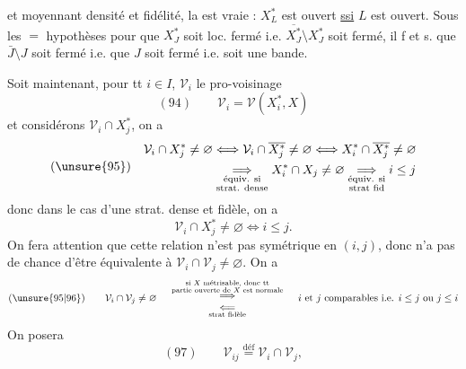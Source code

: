 
et moyennant densité et fidélité, la   est vraie : $X_L^*$ est ouvert \uline{ssi} $L$ est ouvert. Sous les $=$ hypothèses pour que $X_J^*$ soit loc. fermé i.e. $\overline{X_J^*}\setminus X_J^*$  soit fermé,  il f et s. que $\bar J\setminus J$ soit fermé i.e. que $J$ soit  fermé i.e. soit une bande.

Soit maintenant, pour tt $i\in I$, $\mathcal V_i$ le pro-voisinage
\[(94)\qquad\mathcal V_i=\mathcal V(X_i^*,X)\]
et considérons $\mathcal V_i\cap X_j^*$, on a
\[
(\unsure{95})\quad\begin{aligned}
\mathcal V_i\cap X_j^*\neq\varnothing&\Longleftrightarrow\mathcal V_i\cap\overline{X_j^*}\neq\varnothing\Longleftrightarrow X_i^*\cap\overline{X_j^*}\neq\varnothing\\
&\underset{\substack{\text{équiv. si}\\\text{strat. dense}}}{\Longrightarrow}X_i^*\cap X_j\neq\varnothing\underset{\substack{\text{équiv. si}\\\text{strat fid}}}{\Longrightarrow}i\leq j
\end{aligned}
\]
donc dans le cas d'une strat. dense et fidèle,  on a
\[\mathcal V_i\cap X_j^*\neq\varnothing\Longleftrightarrow i\leq j.\]
On fera attention que cette relation n'est pas symétrique en $(i,j)$,  donc n'a pas de chance d'être équivalente à $\mathcal V_i\cap\mathcal V_j\neq\varnothing$. On a
\[
(\unsure{95|96})\qquad\mathcal V_i\cap\mathcal V_j\neq\varnothing\quad
\begin{array}{c}
\overset{\substack{\text{si $X$ métrisable, donc tt}\\\text{partie ouverte de $X$ est normale}}}{\Longrightarrow}\\
\underset{\text{strat fidèle}}{\Longleftarrow}
\end{array}
\quad\text{$i$ et $j$ comparables i.e. $i\leq j$ ou $j\leq i$}
\]
On posera
\[(97)\qquad\mathcal V_{ij}\overset{\mathrm{déf}}=\mathcal V_i\cap\mathcal V_j,\]
